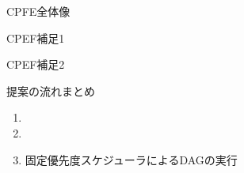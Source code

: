 
\begin{frame}[label=alg2]{CPFE全体像}
\end{frame}

\begin{frame}{CPEF補足1}
\end{frame}

\begin{frame}{CPEF補足2}
\end{frame}

\begin{frame}{提案の流れまとめ}
    \begin{enumerate}
        \item {}
        \item {}
        \item 固定優先度スケジューラによるDAGの実行
    \end{enumerate}
\end{frame}
